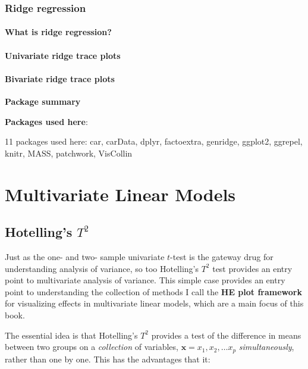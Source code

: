 \documentclass[
  letterpaper,
  10pt,
  krantz2]{krantz}
\begin{document}
\section{Ridge regression}\label{sec:ridge}

\subsection{What is ridge regression?}\label{what-is-ridge-regression}

\subsection{Univariate ridge trace
plots}\label{univariate-ridge-trace-plots}

\subsection{Bivariate ridge trace
plots}\label{bivariate-ridge-trace-plots}

\textbf{Package summary}

\textbf{Packages used here}:

11 packages used here: car, carData, dplyr, factoextra, genridge,
ggplot2, ggrepel, knitr, MASS, patchwork, VisCollin

\part{Multivariate Linear Models}

\chapter{\texorpdfstring{Hotelling's
\(T^2\)}{Hotelling's T\^{}2}}\label{sec-Hotelling}

Just as the one- and two- sample univariate \(t\)-test is the gateway
drug for understanding analysis of variance, so too Hotelling's \(T^2\)
test provides an entry point to multivariate analysis of variance. This
simple case provides an entry point to understanding the collection of
methods I call the \textbf{HE plot framework} for visualizing effects in
multivariate linear models, which are a main focus of this book.

The essential idea is that Hotelling's \(T^2\) provides a test of the
difference in means between two groups on a \emph{collection} of
variables, \(\mathbf{x} = x_1, x_2, \dots x_p\) \emph{simultaneously},
rather than one by one. This has the advantages that it:
\end{document}
